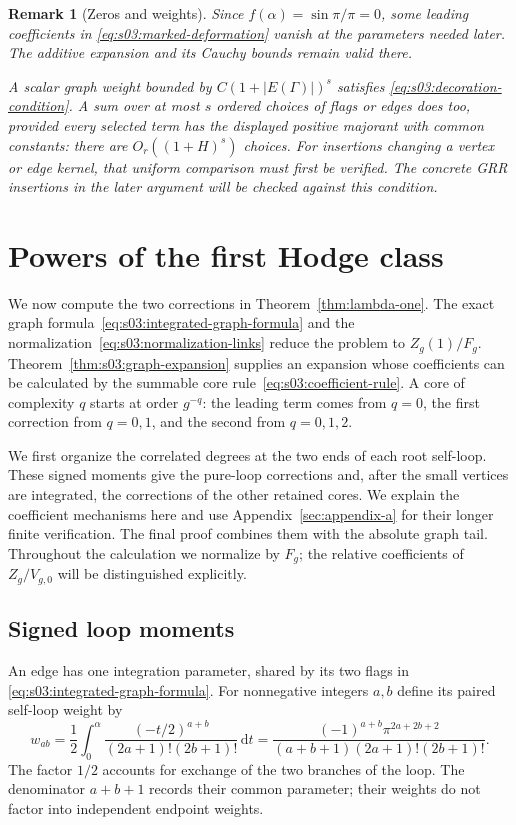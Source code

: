\documentclass[a4paper,10pt]{article}
\numberwithin{equation}{section}
\newcommand{\dd}{\mathrm{d}}
\theoremstyle{paperplain}
\theoremstyle{paperremark}
\newtheorem{rmk}{Remark}[section]
\theoremstyle{paperplain}
\begin{document}
\begin{rmk}[Zeros and weights]
Since $f(\alpha)=\sin\pi/\pi=0$, some leading coefficients in
\eqref{eq:s03:marked-deformation} vanish at the parameters needed
later. The additive expansion and its Cauchy bounds remain valid
there.

A scalar graph weight bounded by $C(1+|E(\Gamma)|)^s$ satisfies
\eqref{eq:s03:decoration-condition}. A sum over at most $s$
ordered choices of flags or edges does too, provided every selected
term has the displayed positive majorant with common constants:
there are $O_r((1+H)^s)$ choices. For insertions changing a vertex
or edge kernel, that uniform comparison must first be verified.
The concrete GRR insertions in the later argument will be checked
against this condition.
\end{rmk}


\section{Powers of the first Hodge class}
\label{sec:s04}

We now compute the two corrections in Theorem~\ref{thm:lambda-one}.
The exact graph formula~\eqref{eq:s03:integrated-graph-formula} and
the normalization~\eqref{eq:s03:normalization-links} reduce the problem
to $Z_g(1)/F_g$. Theorem~\ref{thm:s03:graph-expansion} supplies an
expansion whose coefficients can be calculated by the summable core
rule~\eqref{eq:s03:coefficient-rule}. A core of complexity $q$ starts
at order $g^{-q}$: the leading term comes from $q=0$, the first
correction from $q=0,1$, and the second from $q=0,1,2$.

We first organize the correlated degrees at the two ends of each root
self-loop. These signed moments give the pure-loop corrections and,
after the small vertices are integrated, the corrections of the other
retained cores. We explain the coefficient mechanisms here and use
Appendix~\ref{sec:appendix-a} for their longer finite verification.
The final proof combines them with the absolute graph tail. Throughout
the calculation we normalize by $F_g$; the relative coefficients of
$Z_g/V_{g,0}$ will be distinguished explicitly.

\subsection{Signed loop moments}
\label{subsec:s04:01}

An edge has one integration parameter, shared by its two flags in
\eqref{eq:s03:integrated-graph-formula}. For nonnegative integers
$a,b$ define its paired self-loop weight by
\begin{equation}\label{eq:s04:paired-weight}
 w_{ab}=\frac12\int_0^\alpha
       \frac{(-t/2)^{a+b}}{(2a+1)!(2b+1)!}\,\dd t
 =\frac{(-1)^{a+b}\pi^{2a+2b+2}}
       {(a+b+1)(2a+1)!(2b+1)!}.
\end{equation}
The factor $1/2$ accounts for exchange of the two branches of the loop.
The denominator $a+b+1$ records their common parameter; their weights do not factor
into independent endpoint weights.
\end{document}
